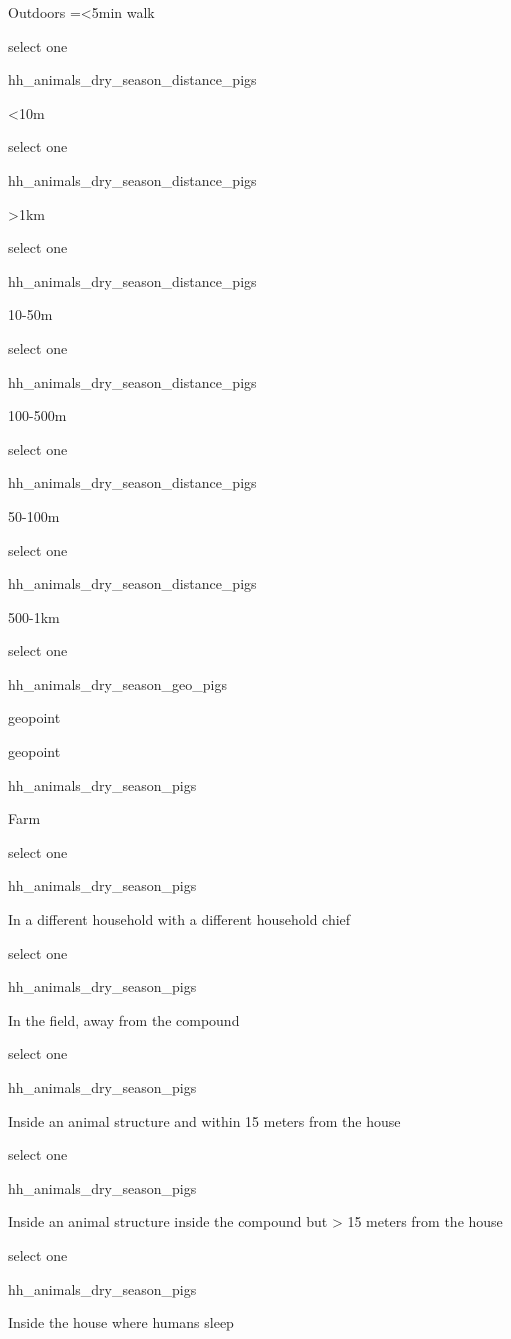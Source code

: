 \documentclass[]{article}
\begin{document}
Outdoors =\textless{}5min walk

select one

hh\_animals\_dry\_season\_distance\_pigs

\textless{}10m

select one

hh\_animals\_dry\_season\_distance\_pigs

\textgreater{}1km

select one

hh\_animals\_dry\_season\_distance\_pigs

10-50m

select one

hh\_animals\_dry\_season\_distance\_pigs

100-500m

select one

hh\_animals\_dry\_season\_distance\_pigs

50-100m

select one

hh\_animals\_dry\_season\_distance\_pigs

500-1km

select one

hh\_animals\_dry\_season\_geo\_pigs

geopoint

geopoint

hh\_animals\_dry\_season\_pigs

Farm

select one

hh\_animals\_dry\_season\_pigs

In a different household with a different household chief

select one

hh\_animals\_dry\_season\_pigs

In the field, away from the compound

select one

hh\_animals\_dry\_season\_pigs

Inside an animal structure and within 15 meters from the house

select one

hh\_animals\_dry\_season\_pigs

Inside an animal structure inside the compound but \textgreater{} 15
meters from the house

select one

hh\_animals\_dry\_season\_pigs

Inside the house where humans sleep
\end{document}
